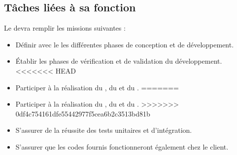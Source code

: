 \subsection*{Tâches liées à sa fonction}

Le \RD{} devra remplir les missions suivantes :
\begin{itemize}
	\item Définir avec le \CP{} les différentes phases de conception et de développement.
	\item Établir les phases de vérification et de validation du développement.
<<<<<<< HEAD
	\item Participer à la réalisation du \DSECourt, du \DSICourt{} et du \PTVCourt.
=======
	\item Participer à la réalisation du \DSECourt{}, du \DSICourt{} et du \PTVCourt.
>>>>>>> 0df4c754161dfe55442977f5cea6b2c3513bd81b
	\item S'assurer de la réussite des tests unitaires et d'intégration.
	\item S'assurer que les codes fournis fonctionneront également chez le client.
\end{itemize}
